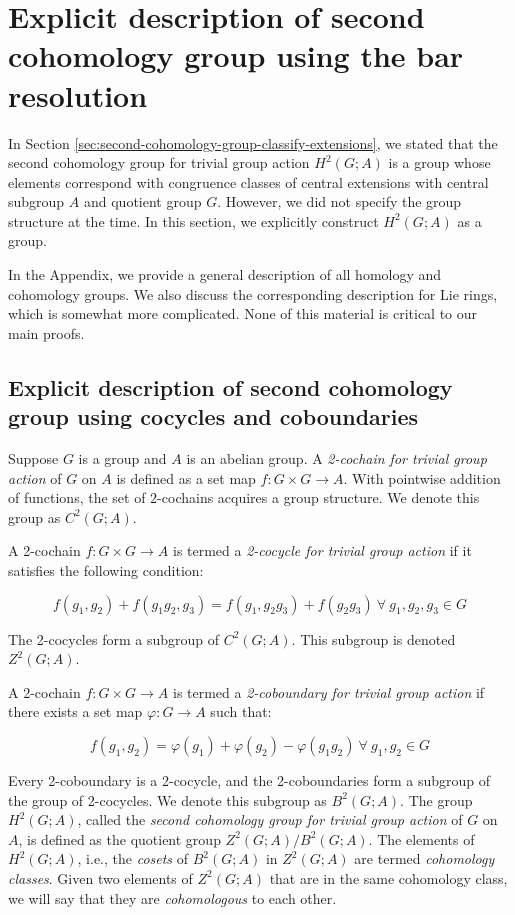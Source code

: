 \documentclass{ucetd}
\begin{document}
\section{Explicit description of second cohomology group using the bar resolution}\label{sec:cohomology-explicit}

In Section \ref{sec:second-cohomology-group-classify-extensions}, we
stated that the second cohomology group for trivial group action
$H^2(G;A)$ is a group whose elements correspond with congruence
classes of central extensions with central subgroup $A$ and quotient
group $G$. However, we did not specify the group structure at the
time. In this section, we explicitly construct $H^2(G;A)$ as a group.

In the Appendix, we provide a general description of all homology and
cohomology groups. We also discuss the corresponding description for
Lie rings, which is somewhat more complicated. None of this material
is critical to our main proofs.

\subsection{Explicit description of second cohomology group using cocycles and coboundaries}

Suppose $G$ is a group and $A$ is an abelian group. A {\em 2-cochain
  for trivial group action} of $G$ on $A$ is defined as a set map $f:
G \times G \to A$. With pointwise addition of functions, the set of
$2$-cochains acquires a group structure. We denote this group as $C^2(G;A)$.

A 2-cochain $f:G \times G \to A$ is termed a {\em 2-cocycle for
  trivial group action} if it satisfies the following condition:

$$f(g_1,g_2) + f(g_1g_2,g_3) = f(g_1,g_2g_3) + f(g_2g_3) \ \forall \ g_1,g_2,g_3 \in G$$

The 2-cocycles form a subgroup of $C^2(G;A)$. This subgroup is denoted
$Z^2(G;A)$.

A 2-cochain $f:G \times G \to A$ is termed a {\em 2-coboundary for
  trivial group action} if there exists a set map $\varphi:G \to A$
such that:

$$f(g_1,g_2) = \varphi(g_1) + \varphi(g_2) - \varphi(g_1g_2)\ \forall \ g_1,g_2 \in G$$

Every 2-coboundary is a 2-cocycle, and the 2-coboundaries form a
subgroup of the group of 2-cocycles. We denote this subgroup as
$B^2(G;A)$. The group $H^2(G;A)$, called the {\em second cohomology
  group for trivial group action} of $G$ on $A$, is defined as the
quotient group $Z^2(G;A)/B^2(G;A)$. The elements of $H^2(G;A)$, i.e.,
the {\em cosets} of $B^2(G;A)$ in $Z^2(G;A)$ are termed {\em
  cohomology classes}. Given two elements of $Z^2(G;A)$ that are in
the same cohomology class, we will say that they are {\em
  cohomologous} to each other.
\end{document}
